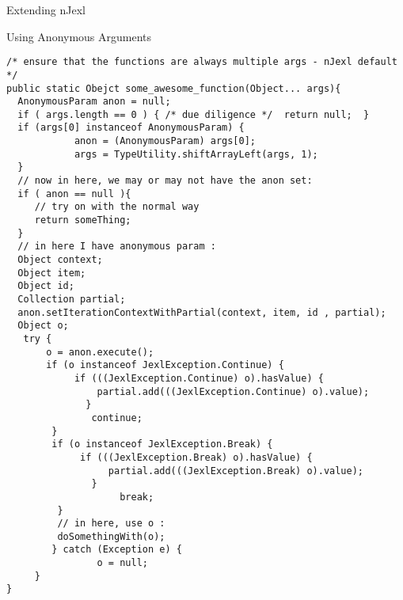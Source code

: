 \begin{section}{Extending nJexl}
\begin{subsection}{Using Anonymous Arguments}
\begin{center}\begin{minipage}{\linewidth}
\begin{lstlisting}[style=myJavaStyle]
/* ensure that the functions are always multiple args - nJexl default */
public static Obejct some_awesome_function(Object... args){
  AnonymousParam anon = null;
  if ( args.length == 0 ) { /* due diligence */  return null;  }
  if (args[0] instanceof AnonymousParam) {
            anon = (AnonymousParam) args[0];
            args = TypeUtility.shiftArrayLeft(args, 1);
  }
  // now in here, we may or may not have the anon set:
  if ( anon == null ){
     // try on with the normal way 
     return someThing; 
  }
  // in here I have anonymous param :
  Object context;
  Object item;
  Object id;
  Collection partial;
  anon.setIterationContextWithPartial(context, item, id , partial);
  Object o;
   try {
       o = anon.execute();
       if (o instanceof JexlException.Continue) {
            if (((JexlException.Continue) o).hasValue) {
                partial.add(((JexlException.Continue) o).value);
              }
               continue;
        }
        if (o instanceof JexlException.Break) {
             if (((JexlException.Break) o).hasValue) {
                  partial.add(((JexlException.Break) o).value);
               }
                    break;
         }
         // in here, use o :
         doSomethingWith(o);
        } catch (Exception e) {
                o = null;
     }
}
\end{lstlisting}
\end{minipage}\end{center}

\end{subsection}


\end{section}
